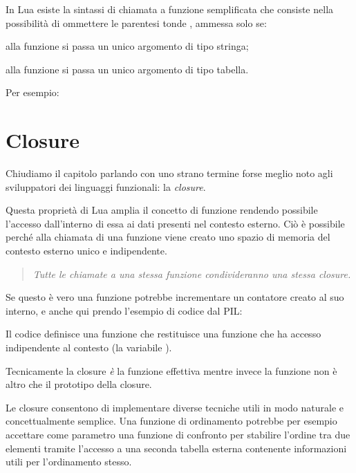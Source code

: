 In Lua esiste la sintassi di chiamata a funzione semplificata che consiste nella
possibilità di ommettere le parentesi tonde \key{()}, ammessa solo se:
\begin{compactitemize}
\item alla funzione si passa un unico argomento di tipo stringa;
\item alla funzione si passa un unico argomento di tipo tabella.
\end{compactitemize}

Per esempio:


\section{Closure}
\label{secClosure}

Chiudiamo il capitolo parlando con uno strano termine forse meglio noto agli
sviluppatori dei linguaggi funzionali: la \emph{closure}.

Questa proprietà di Lua amplia il concetto di funzione rendendo possibile
l'accesso dall'interno di essa ai dati presenti nel contesto esterno. Ciò è
possibile perché alla chiamata di una funzione viene creato uno spazio di
memoria del contesto esterno unico e indipendente.

\begin{quote}
\emph{%
Tutte le chiamate a una stessa funzione condivideranno una stessa closure.%
}
\end{quote}

Se questo è vero una funzione potrebbe incrementare un contatore creato al suo
interno, e anche qui prendo l'esempio di codice dal PIL:

Il codice definisce una funzione  che restituisce una
funzione che ha accesso indipendente al contesto (la variabile ).

Tecnicamente la closure \emph{è} la funzione effettiva mentre invece la
funzione non è altro che il prototipo della closure.

Le closure consentono di implementare diverse tecniche utili in modo naturale e
concettualmente semplice. Una funzione di ordinamento potrebbe per esempio
accettare come parametro una funzione di confronto per stabilire l'ordine tra
due elementi tramite l'accesso a una seconda tabella esterna contenente
informazioni utili per l'ordinamento stesso.

